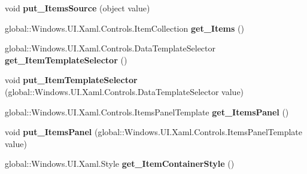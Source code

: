 \begin{DoxyCompactItemize}
\item 
\mbox{\label{interface_windows_1_1_u_i_1_1_xaml_1_1_controls_1_1_i_items_control_ac735d213748166057ef4cbaae62e336e}} 
void {\bfseries put\+\_\+\+Items\+Source} (object value)
\item 
\mbox{\label{interface_windows_1_1_u_i_1_1_xaml_1_1_controls_1_1_i_items_control_a747bf3c87ce3337134354f5d9b743404}} 
global\+::\+Windows.\+U\+I.\+Xaml.\+Controls.\+Item\+Collection {\bfseries get\+\_\+\+Items} ()
\item 
\mbox{\label{interface_windows_1_1_u_i_1_1_xaml_1_1_controls_1_1_i_items_control_ab87924da926fb493c4e9f1d66f5e3327}} 
global\+::\+Windows.\+U\+I.\+Xaml.\+Controls.\+Data\+Template\+Selector {\bfseries get\+\_\+\+Item\+Template\+Selector} ()
\item 
\mbox{\label{interface_windows_1_1_u_i_1_1_xaml_1_1_controls_1_1_i_items_control_aa561637adcee5715eed974d70e6d813a}} 
void {\bfseries put\+\_\+\+Item\+Template\+Selector} (global\+::\+Windows.\+U\+I.\+Xaml.\+Controls.\+Data\+Template\+Selector value)
\item 
\mbox{\label{interface_windows_1_1_u_i_1_1_xaml_1_1_controls_1_1_i_items_control_ab7176badfe60bbefeb142105c2d8637a}} 
global\+::\+Windows.\+U\+I.\+Xaml.\+Controls.\+Items\+Panel\+Template {\bfseries get\+\_\+\+Items\+Panel} ()
\item 
\mbox{\label{interface_windows_1_1_u_i_1_1_xaml_1_1_controls_1_1_i_items_control_af7be75b1cc3df63d782025e03364f6ea}} 
void {\bfseries put\+\_\+\+Items\+Panel} (global\+::\+Windows.\+U\+I.\+Xaml.\+Controls.\+Items\+Panel\+Template value)
\item 
\mbox{\label{interface_windows_1_1_u_i_1_1_xaml_1_1_controls_1_1_i_items_control_a4459707c1f50a2985881f9d3053ab38f}} 
global\+::\+Windows.\+U\+I.\+Xaml.\+Style {\bfseries get\+\_\+\+Item\+Container\+Style} ()

\end{DoxyCompactItemize}
